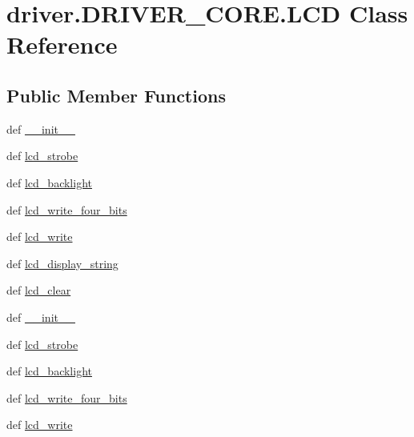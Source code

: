 \hypertarget{classdriver_1_1DRIVER__CORE_1_1LCD}{}\section{driver.\+D\+R\+I\+V\+E\+R\+\_\+\+C\+O\+R\+E.\+L\+C\+D Class Reference}
\label{classdriver_1_1DRIVER__CORE_1_1LCD}
\subsection*{Public Member Functions}
\begin{DoxyCompactItemize}
\item 
def \hyperlink{classdriver_1_1DRIVER__CORE_1_1LCD_a42d8dfae2030675de36c798311a4c081}{\+\_\+\+\_\+init\+\_\+\+\_\+}
\item 
def \hyperlink{classdriver_1_1DRIVER__CORE_1_1LCD_adb4ade1f425d0a6e2381d0867ee1b28e}{lcd\+\_\+strobe}
\item 
def \hyperlink{classdriver_1_1DRIVER__CORE_1_1LCD_a8e3c81f32062f6696ab645b4c3b5ef04}{lcd\+\_\+backlight}
\item 
def \hyperlink{classdriver_1_1DRIVER__CORE_1_1LCD_a68e940af4dc6aa7e973d87b4f2aab36e}{lcd\+\_\+write\+\_\+four\+\_\+bits}
\item 
def \hyperlink{classdriver_1_1DRIVER__CORE_1_1LCD_ab58cedfbef364410e3eb958a2af041fd}{lcd\+\_\+write}
\item 
def \hyperlink{classdriver_1_1DRIVER__CORE_1_1LCD_a164b4819a2e592ae683f4db5902d88f2}{lcd\+\_\+display\+\_\+string}
\item 
def \hyperlink{classdriver_1_1DRIVER__CORE_1_1LCD_a3242b603d9dd21803d4283e714d76c1e}{lcd\+\_\+clear}
\item 
def \hyperlink{classdriver_1_1DRIVER__CORE_1_1LCD_a42d8dfae2030675de36c798311a4c081}{\+\_\+\+\_\+init\+\_\+\+\_\+}
\item 
def \hyperlink{classdriver_1_1DRIVER__CORE_1_1LCD_adb4ade1f425d0a6e2381d0867ee1b28e}{lcd\+\_\+strobe}
\item 
def \hyperlink{classdriver_1_1DRIVER__CORE_1_1LCD_a8e3c81f32062f6696ab645b4c3b5ef04}{lcd\+\_\+backlight}
\item 
def \hyperlink{classdriver_1_1DRIVER__CORE_1_1LCD_a68e940af4dc6aa7e973d87b4f2aab36e}{lcd\+\_\+write\+\_\+four\+\_\+bits}
\item 
def \hyperlink{classdriver_1_1DRIVER__CORE_1_1LCD_ab58cedfbef364410e3eb958a2af041fd}{lcd\+\_\+write}
\item 

\end{DoxyCompactItemize}
